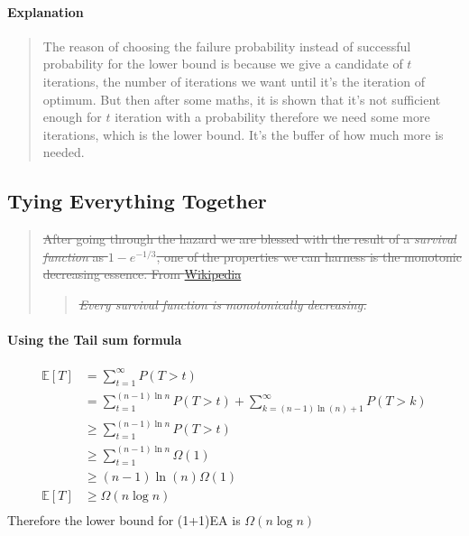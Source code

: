 \documentclass[a4paper, 12pt]{article}
\begin{document}
        \paragraph{Explanation}
            \begin{quote}
                The reason of choosing the failure probability instead of successful probability for the lower bound is because we give a candidate of $t$
                iterations, the number of iterations we want until it's the iteration of optimum. But then after some maths, it is shown that it's not
                sufficient enough for $t$ iteration with a probability therefore we need some more iterations, which is the lower bound. It's the buffer of 
                how much more is needed.
            \end{quote}
    \subsection{Tying Everything Together}
        \begin{quote}
            \sout{After going through the hazard we are blessed with the result of a \emph{survival function} as $1 - e^{-1/3}$, one of the properties we can harness
            is the monotonic decreasing essence. From \href{https://en.wikipedia.org/wiki/Survival_function}{Wikipedia}}
            \begin{quote}
                \sout{\itshape Every survival function is monotonically decreasing. }
            \end{quote}
        \end{quote}
        \paragraph{Using the Tail sum formula}
        \begin{align*}
            \mathbb{E}[T] &= \sum_{t=1}^{\infty}P(T>t)\\
            &= \sum_{t=1}^{(n-1)\ln n}P(T>t) + \sum_{k=(n-1)\ln(n) + 1}^{\infty}P(T>k)\\
            &\geq \sum_{t=1}^{(n-1)\ln n}P(T>t)\\
            &\geq \sum_{t=1}^{(n-1)\ln n}\Omega(1)\\
            &\geq (n-1)\ln(n)\Omega(1)\\
            \mathbb{E}[T]&\geq \Omega(n\log n)\\
        \end{align*}
        Therefore the lower bound for (1+1)EA is $\Omega(n\log n)$
\end{document}
